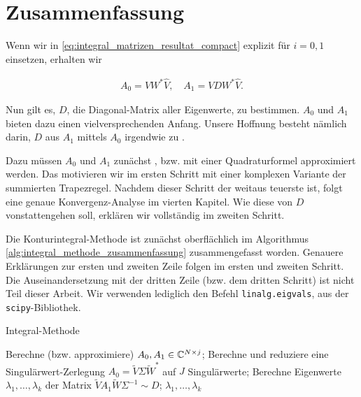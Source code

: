\section{Zusammenfassung}

Wenn wir in \eqref{eq:integral_matrizen_resultat_compact} explizit für $i = 0, 1$ einsetzen, erhalten wir

\begin{align} \label{eq:integral_matrizen_resultat}
    A_0 = V W^\ast \hat V,
    \quad
    A_1 = V D W^\ast \hat V.
\end{align}

Nun gilt es, $D$, die Diagonal-Matrix aller Eigenwerte, zu bestimmen.
$A_0$ und $A_1$ bieten dazu einen vielversprechenden Anfang.
Unsere Hoffnung besteht nämlich darin, $D$ aus $A_1$ mittels $A_0$ irgendwie zu .

Dazu müssen $A_0$ und $A_1$ zunächst , bzw. mit einer Quadraturformel approximiert werden.
Das motivieren wir im ersten Schritt mit einer komplexen Variante der summierten Trapezregel.
Nachdem dieser Schritt der weitaus teuerste ist, folgt eine genaue Konvergenz-Analyse im vierten Kapitel.
Wie diese  von $D$ vonstattengehen soll, erklären wir vollständig im zweiten Schritt.

Die Konturintegral-Methode ist zunächst oberflächlich im Algorithmus \ref{alg:integral_methode_zusammenfassung} zusammengefasst worden.
Genauere Erklärungen zur ersten und zweiten Zeile folgen im ersten und zweiten Schritt.
Die Auseinandersetzung mit der dritten Zeile (bzw. dem dritten Schritt) ist nicht Teil dieser Arbeit.
Wir verwenden lediglich den Befehl \texttt{linalg.eigvals}, aus der \texttt{scipy}-Bibliothek.

\begin{algorithm}[H]
	\caption{Integral-Methode}
    \begin{algorithmic}[0]
            \State Berechne (bzw. approximiere) $A_0, A_1 \in \mathbb{C}^{N \times j}$;
            \State Berechne und reduziere eine Singulärwert-Zerlegung $A_0 = \tilde V \Sigma \tilde W^\ast$ auf $J$ Singulärwerte;
            \State Berechne Eigenwerte $\lambda_1, \dots, \lambda_k$ der Matrix $\tilde V A_1 \tilde W \Sigma^{-1} \sim D$;
            \State \Return $\lambda_1, \dots, \lambda_k$
		\EndProcedure
    \end{algorithmic}
    \caption{}
    \label{alg:integral_methode_zusammenfassung}
\end{algorithm}
